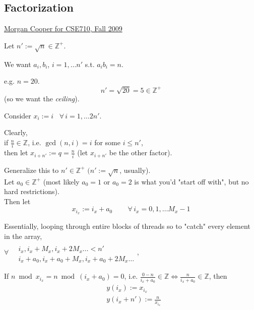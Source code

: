 \documentclass[10pt]{amsart}
\begin{document}
\begin{multicols*}{2}


\section{Factorization}

\href{https://www.cse.buffalo.edu//faculty/miller/Courses/CSE710/Factorization_of_a_Large_number.pdf}{Morgan Cooper for CSE710, Fall 2009}

Let $n' := \sqrt{n} \in \mathbb{Z}^+$.  

We want $a_i, b_i$, $i=1,\dots n'$ s.t. $a_i b_i = n$.  

e.g. $n=20$.  
\[
n' = \sqrt{20} = 5 \in \mathbb{Z}^+
\]
(so we want the \emph{ceiling}).

Consider $x_i := i$ \, $ \forall \, i =  1, \dots 2n'$. 

Clearly, \\
if $\frac{n}{i} \in \mathbb{Z}$, i.e. $\gcd(n,i)=i$ for some $i\leq n'$, \\
then let $x_{i+n'} := q = \frac{n}{i}$ (let $x_{i+n'}$ be the other factor).  

Generalize this to 
$n' \in \mathbb{Z}^+$ $(n':= \sqrt{n}$, usually).  \\
Let $a_0 \in \mathbb{Z}^+$ (most likely $a_0 =1$ or $a_0 = 2$ is what you'd "start off with", but no hard restrictions).  \\
Then let 
\[
x_{i_x} := i_x + a_0 \qquad \, \forall \, i_x = 0,1,\dots M_x -1 
\]

Essentially, looping through entire blocks of threads so to "catch" every element in the array,  \\
$\forall \, \begin{aligned} & \quad \\ 
& i_x , i_x + M_x, i_x + 2M_x \dots < n' \\
& i_x + a_0, i_x + a_0 + M_x, i_x + a_0 + 2M_x \dots \end{aligned}$, 

If $n \bmod{x_{i_x}} = n \bmod{(i_x + a_0)} = 0$, i.e. $\frac{ 0 - n}{i_x + a_0} \in \mathbb{Z} \Longleftrightarrow \frac{n}{ i_x+ a_0 } \in \mathbb{Z}$, then 
\[
\begin{aligned}
& y(i_x) := x_{i_x} \\ 
& y(i_x + n') := \frac{n}{x_{i_x}}
\end{aligned}
\]




\end{multicols*}
\end{document}
